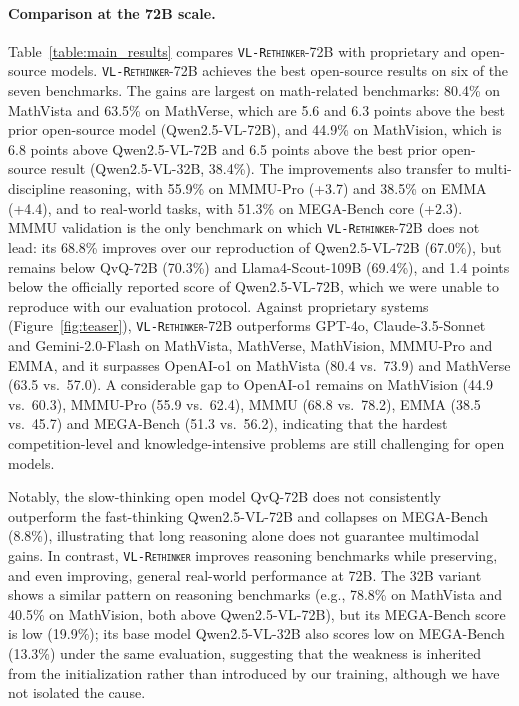 \documentclass{article}
\newcommand{\model}{\texttt{\textsc{VL-Rethinker}}\xspace}
\begin{document}
\paragraph{Comparison at the 72B scale.} Table~\ref{table:main_results} compares \model-72B with proprietary and open-source models. \model-72B achieves the best open-source results on six of the seven benchmarks. The gains are largest on math-related benchmarks: 80.4\% on MathVista and 63.5\% on MathVerse, which are 5.6 and 6.3 points above the best prior open-source model (Qwen2.5-VL-72B), and 44.9\% on MathVision, which is 6.8 points above Qwen2.5-VL-72B and 6.5 points above the best prior open-source result (Qwen2.5-VL-32B, 38.4\%). The improvements also transfer to multi-discipline reasoning, with 55.9\% on MMMU-Pro (+3.7) and 38.5\% on EMMA (+4.4), and to real-world tasks, with 51.3\% on MEGA-Bench core (+2.3). MMMU validation is the only benchmark on which \model-72B does not lead: its 68.8\% improves over our reproduction of Qwen2.5-VL-72B (67.0\%), but remains below QvQ-72B (70.3\%) and Llama4-Scout-109B (69.4\%), and 1.4 points below the officially reported score of Qwen2.5-VL-72B, which we were unable to reproduce with our evaluation protocol. Against proprietary systems (Figure~\ref{fig:teaser}), \model-72B outperforms GPT-4o, Claude-3.5-Sonnet and Gemini-2.0-Flash on MathVista, MathVerse, MathVision, MMMU-Pro and EMMA, and it surpasses OpenAI-o1 on MathVista (80.4 vs.\ 73.9) and MathVerse (63.5 vs.\ 57.0). A considerable gap to OpenAI-o1 remains on MathVision (44.9 vs.\ 60.3), MMMU-Pro (55.9 vs.\ 62.4), MMMU (68.8 vs.\ 78.2), EMMA (38.5 vs.\ 45.7) and MEGA-Bench (51.3 vs.\ 56.2), indicating that the hardest competition-level and knowledge-intensive problems are still challenging for open models.

Notably, the slow-thinking open model QvQ-72B does not consistently outperform the fast-thinking Qwen2.5-VL-72B and collapses on MEGA-Bench (8.8\%), illustrating that long reasoning alone does not guarantee multimodal gains. In contrast, \model improves reasoning benchmarks while preserving, and even improving, general real-world performance at 72B. The 32B variant shows a similar pattern on reasoning benchmarks (e.g., 78.8\% on MathVista and 40.5\% on MathVision, both above Qwen2.5-VL-72B), but its MEGA-Bench score is low (19.9\%); its base model Qwen2.5-VL-32B also scores low on MEGA-Bench (13.3\%) under the same evaluation, suggesting that the weakness is inherited from the initialization rather than introduced by our training, although we have not isolated the cause.
\end{document}
